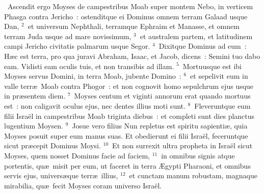 ~Ascendit ergo Moyses de campestribus Moab super montem Nebo, in verticem Phasga contra Jericho~: ostenditque ei Dominus omnem terram Galaad usque Dan,
${}^{2}$~et universum Nephthali, terramque Ephraim et Manasse, et omnem terram Juda usque ad mare novissimum,
${}^{3}$~et australem partem, et latitudinem campi Jericho civitatis palmarum usque Segor.
${}^{4}$~Dixitque Dominus ad eum~: H\ae c est terra, pro qua juravi Abraham, Isaac, et Jacob, dicens~: Semini tuo dabo eam. Vidisti eam oculis tuis, et non transibis ad illam.
${}^{5}$~Mortuusque est ibi Moyses servus Domini, in terra Moab, jubente Domino~:
${}^{6}$~et sepelivit eum in valle terr\ae\ Moab contra Phogor~: et non cognovit homo sepulchrum ejus usque in pr\ae sentem diem.
${}^{7}$~Moyses centum et viginti annorum erat quando mortuus est~: non caligavit oculus ejus, nec dentes illius moti sunt.
${}^{8}$~Fleveruntque eum filii Isra\"el in campestribus Moab triginta diebus~: et completi sunt dies planctus lugentium Moysen.
${}^{9}$~Josue vero filius Nun repletus est spiritu sapienti\ae , quia Moyses posuit super eum manus suas. Et obedierunt ei filii Isra\"el, feceruntque sicut pr\ae cepit Dominus Moysi.
${}^{10}$~Et non surrexit ultra propheta in Isra\"el sicut Moyses, quem nosset Dominus facie ad faciem,
${}^{11}$~in omnibus signis atque portentis, qu\ae\ misit per eum, ut faceret in terra \AE gypti Pharaoni, et omnibus servis ejus, univers\ae que terr\ae\ illius,
${}^{12}$~et cunctam manum robustam, magnaque mirabilia, qu\ae\ fecit Moyses coram universo Isra\"el.
